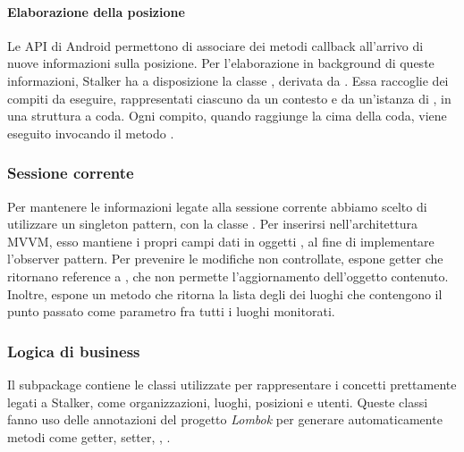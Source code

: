 \documentclass[../../manuale-manutentore.tex]{subfiles}
\begin{document}
\paragraph{Elaborazione della posizione}%
\label{par:elaborazione_della_posizione}

Le API di Android permettono di associare dei metodi callback all'arrivo di nuove informazioni sulla posizione.
Per l'elaborazione in background di queste informazioni, Stalker ha a disposizione la classe \linebreak{}, derivata da .
Essa raccoglie dei compiti da eseguire, rappresentati ciascuno da un contesto e da un'istanza di , in una struttura a coda.
Ogni compito, quando raggiunge la cima della coda, viene eseguito invocando il metodo \linebreak{}.

\subsubsection{Sessione corrente}%
\label{subs:sessione_corrente}

Per mantenere le informazioni legate alla sessione corrente abbiamo scelto di utilizzare un singleton pattern, con la classe .
Per inserirsi nell'architettura MVVM, esso mantiene i propri campi dati in oggetti , al fine di implementare l'observer pattern.
Per prevenire le modifiche non controllate, espone getter che ritornano reference a , che non permette l'aggiornamento dell'oggetto contenuto.
Inoltre, espone un metodo  che ritorna la lista degli  dei luoghi che contengono il punto passato come parametro fra tutti i luoghi monitorati.

\subsubsection{Logica di business}%
\label{subs:logica_di_business}

Il subpackage  contiene le classi utilizzate per rappresentare i concetti prettamente legati a Stalker, come organizzazioni, luoghi, posizioni e utenti.
Queste classi fanno uso delle annotazioni del progetto \textit{Lombok} per generare automaticamente metodi come getter, setter, , .
\end{document}
